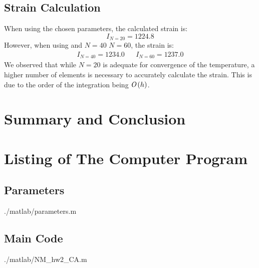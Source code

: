\documentclass[11pt, a4paper]{article}
\begin{document}
\subsection{Strain Calculation}
When using the chosen parameters, the calculated strain is:
\begin{equation}
    I_{N=20}=1224.8
\end{equation}
However, when using and $N=40$ $N=60$, the strain is:
\begin{equation}
    \begin{matrix}
        I_{N=40}=1234.0 && I_{N=60}=1237.0
    \end{matrix}
\end{equation}
We observed that while $N = 20$ is adequate for convergence of the temperature, a higher number of elements is necessary to accurately calculate the strain. This is due to the order of the integration being $\emph{O}\left(h\right)$. 

\section{Summary and Conclusion}

\newpage
\appendix
\section{Listing of The Computer Program}
\subsection{Parameters}
\begin{lstinputlisting}[captionpos=b,stringstyle=\color{magenta},frame=single, numbers=left, style=MatLab-editor, basicstyle=\mlttfamily\small, caption={Parameters file},mlshowsectionrules=true]{./matlab/parameters.m}
\end{lstinputlisting}

\subsection{Main Code}
\begin{lstinputlisting}[captionpos=b,stringstyle=\color{magenta},frame=single, numbers=left, style=MatLab-editor, basicstyle=\mlttfamily\small, caption={The main file},mlshowsectionrules=true]{./matlab/NM_hw2_CA.m}
\end{lstinputlisting}
\end{document}
